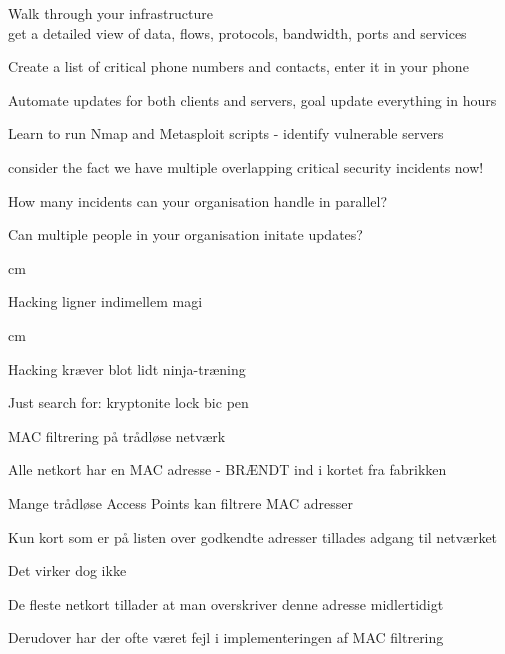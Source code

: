 \documentclass[20pt,landscape,a4paper,footrule]{foils}
\begin{document}

\begin{list2}
\item Walk through your infrastructure\\
get a detailed view of data, flows, protocols, bandwidth, ports and services

\item Create a list of critical phone numbers and contacts, enter it in your phone
\item Automate updates for both clients and servers, goal update everything in hours
\item Learn to run Nmap and Metasploit scripts - identify vulnerable servers
\end{list2}

\vskip 2cm
\centerline{consider the fact we have multiple overlapping critical security incidents now!}

\vskip 2cm
How many incidents can your organisation handle in parallel?

Can multiple people in your organisation initate updates?





 cm

\centerline{Hacking ligner indimellem  magi}




 cm
\centerline{Hacking kræver blot lidt ninja-træning}



\begin{list1}
\item Just search for: kryptonite lock bic pen
\item {}
\end{list1}




\begin{list1}
\item MAC filtrering på trådløse netværk
\item Alle netkort har en MAC adresse - BRÆNDT ind i kortet fra fabrikken
\item Mange trådløse Access Points kan filtrere MAC adresser
\item Kun kort som er på listen over godkendte adresser tillades adgang til netværket
\pause
\item Det virker dog ikke \smiley
\item De fleste netkort tillader at man overskriver denne adresse midlertidigt
\item Derudover har der ofte været fejl i implementeringen af MAC filtrering
\end{list1}
\end{document}
